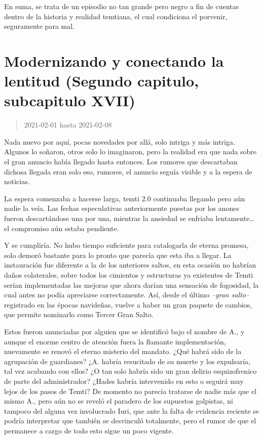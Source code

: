 \documentclass[
  spanish,
]{book}
\begin{document}
En suma, se trata de un episodio no tan grande pero negro a fin de cuentas dentro de la historia y realidad temtiana, el cual condiciona el porvenir, seguramente para mal.

\hypertarget{modernizando-y-conectando-la-lentitud-segundo-capitulo-subcapitulo-xvii}{%
\section{Modernizando y conectando la lentitud (Segundo capitulo, subcapitulo XVII)}\label{modernizando-y-conectando-la-lentitud-segundo-capitulo-subcapitulo-xvii}}

\begin{quote}
2021-02-01 hasta 2021-02-08
\end{quote}

Nada nuevo por aquí, pocas novedades por allá, solo intriga y más intriga. Algunos lo soñaron, otros solo lo imaginaron, pero la realidad era que nada sobre el gran anuncio había llegado hasta entonces. Los rumores que descartaban dichosa llegada eran solo eso, rumores, el anuncio seguía visible y a la espera de noticias.

La espera comenzaba a hacerse larga, temti 2.0 continuaba llegando pero aún nadie la veía. Las fechas especulativas anteriormente puestas por los anones fueron descartándose una por una, mientras la ansiedad se enfriaba lentamente\ldots{} el compromiso aún estaba pendiente.

Y se cumpliría. No hubo tiempo suficiente para catalogarla de eterna promesa, solo demoró bastante para lo pronto que parecía que esta iba a llegar. La instauración fue diferente a la de los anteriores saltos, en esta ocasión no habrían daños colaterales, sobre todos los cimientos y estructuras ya existentes de Temti serían implementadas las mejoras que ahora darían una sensación de fogosidad, la cual antes no podía apreciarse correctamente. Así, desde el último \emph{--gran salto--} registrado en las épocas navideñas, vuelve a haber un gran paquete de cambios, que permite nominarlo como Tercer Gran Salto.

Estos fueron anunciadas por alguien que se identificó bajo el nombre de A., y aunque el enorme centro de atención fuera la flamante implementación, nuevamente se renovó el eterno misterio del mandato. ¿Qué habrá sido de la agrupación de guardianes? ¿A. habría resucitado de su muerte y los expulsaría, tal vez acabando con ellos? ¿O tan solo habría sido un gran delirio esquizofrenico de parte del administrador? ¿Hades habría intervenido en esto o seguirá muy lejos de los pasos de Temti?
De momento no parecía tratarse de nadie más que el mismo A., pero aún no se reveló el paradero de los supuestos golpistas, ni tampoco del alguna vez involucrado Iuri, que ante la falta de evidencia reciente se podría interpretar que también se desvinculó totalmente, pero el rumor de que el permanece a cargo de todo esto sigue un poco vigente.
\end{document}
